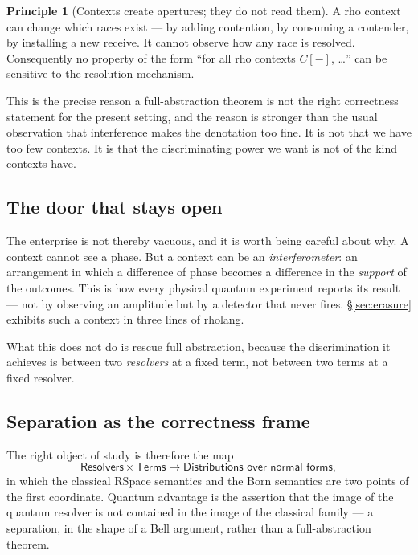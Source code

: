 \documentclass[11pt,a4paper]{article}
\theoremstyle{plain}
\theoremstyle{definition}
\newtheorem{principle}[theorem]{Principle}
\theoremstyle{remark}
\begin{document}
\begin{principle}[Contexts create apertures; they do not read them]\label{prin:aperture}
A rho context can change which races exist --- by adding contention, by
consuming a contender, by installing a new receive. It cannot observe how any
race is resolved. Consequently no property of the form ``for all rho contexts
$C[-]$, \dots'' can be sensitive to the resolution mechanism.
\end{principle}

This is the precise reason a full-abstraction theorem is not the right
correctness statement for the present setting, and the reason is stronger than
the usual observation that interference makes the denotation too fine. It is not
that we have too few contexts. It is that the discriminating power we want is not
of the kind contexts have.

\subsection{The door that stays open}

The enterprise is not thereby vacuous, and it is worth being careful about why.
A context cannot see a phase. But a context can be an \emph{interferometer}: an
arrangement in which a difference of phase becomes a difference in the
\emph{support} of the outcomes. This is how every physical quantum experiment
reports its result --- not by observing an amplitude but by a detector that never
fires. \S\ref{sec:erasure} exhibits such a context in three lines of rholang.

What this does not do is rescue full abstraction, because the discrimination it
achieves is between two \emph{resolvers} at a fixed term, not between two terms
at a fixed resolver.

\subsection{Separation as the correctness frame}

The right object of study is therefore the map
\[
  \textsf{Resolvers} \times \textsf{Terms} \longrightarrow \textsf{Distributions
  over normal forms},
\]
in which the classical RSpace semantics and the Born semantics are two points of
the first coordinate. Quantum advantage is the assertion that the image of the
quantum resolver is not contained in the image of the classical family --- a
separation, in the shape of a Bell argument, rather than a full-abstraction
theorem.
\end{document}
